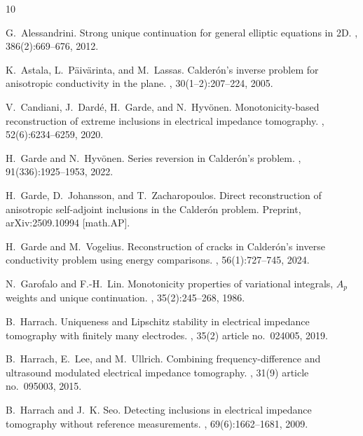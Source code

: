 \documentclass[reqno]{amsart}
\numberwithin{equation}{section}
\numberwithin{figure}{section}
\numberwithin{table}{section}
\theoremstyle{plain}
\theoremstyle{definition}
\theoremstyle{remark}
\begin{document}
	
	\begin{thebibliography}{10}
	
	G.~Alessandrini.
	\newblock Strong unique continuation for general elliptic equations in 2D.
	, 386(2):669--676, 2012.	
	
	K.~Astala, L.~P{\"a}iv{\"a}rinta, and M.~Lassas.
	\newblock Calder\'on's inverse problem for anisotropic conductivity in the plane.
	, 30(1--2):207--224, 2005.
	
	V.~Candiani, J.~Dard\'e, H.~Garde, and N.~Hyv{\"o}nen.
	\newblock Monotonicity-based reconstruction of extreme inclusions in electrical impedance tomography.
	, 52(6):6234--6259, 2020.
		
	H.~Garde and N.~Hyv\"onen.
	\newblock Series reversion in Calder\'on's problem.
	, 91(336):1925--1953, 2022.
	
	H.~Garde, D.~Johansson, and T.~Zacharopoulos.
	\newblock Direct reconstruction of anisotropic self-adjoint inclusions in the Calder\'on problem.
	\newblock Preprint, arXiv:2509.10994 [math.AP].
	
	H.~Garde and M.~Vogelius.
	\newblock Reconstruction of cracks in Calder\'on's inverse conductivity problem using energy comparisons.
	, 56(1):727--745, 2024.
	
	N.~Garofalo and F.-H.~Lin.
	\newblock Monotonicity properties of variational integrals,	$A_p$ weights and unique continuation.
	, 35(2):245--268, 1986.
	
	B.~Harrach.
	\newblock Uniqueness and {L}ipschitz stability in electrical impedance tomography with finitely many electrodes.
	, 35(2) article no.~024005, 2019.
	
	B.~Harrach, E.~Lee, and M.~Ullrich.
	\newblock Combining frequency-difference and ultrasound modulated electrical impedance tomography.
	, 31(9) article no.~095003, 2015.
	
	B.~Harrach and J.~K. Seo.
	\newblock Detecting inclusions in electrical impedance tomography without reference measurements.
	, 69(6):1662--1681, 2009.
	

\end{thebibliography}
\end{document}
